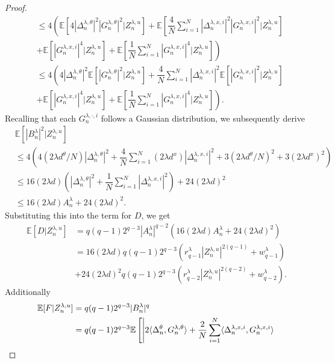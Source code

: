 \documentclass[a4paper, 10pt]{article}
\theoremstyle{plain}%
\begin{document}
\begin{proof}
\begin{align*}
&\leq 4\left(\mathbb{E}\left[4|\Delta_n^{\lambda,\theta}|^2|G_n^{\lambda,\theta}|^2|Z_n^{\lambda,u}\right]+\mathbb{E}\left[\dfrac{4}{N}\sum_{i=1}^N|\Delta_n^{\lambda,x,i}|^2|G_n^{\lambda,x,i}|^2|Z_n^{\lambda,u}\right]\right.\\
&+\left.\mathbb{E}\left[|G_n^{\lambda,x,i}|^4|Z_n^{\lambda,u}\right]+\mathbb{E}\left[\dfrac{1}{N}\sum_{i=1}^N|G_n^{\lambda,x,i}|^4|Z_n^{\lambda,u}\right]\right)\\
&\leq 4\left(4|\Delta_n^{\lambda,\theta}|^2\mathbb{E}\left[|G_n^{\lambda,\theta}|^2|Z_n^{\lambda,u}\right]+\dfrac{4}{N}\sum_{i=1}^N|\Delta_n^{\lambda,x,i}|^2\mathbb{E}\left[|G_n^{\lambda,x,i}|^2|Z_n^{\lambda,u}\right]\right.\\
&+\left.\mathbb{E}\left[|G_n^{\lambda,x,i}|^4|Z_n^{\lambda,u}\right]+\mathbb{E}\left[\dfrac{1}{N}\sum_{i=1}^N|G_n^{\lambda,x,i}|^4|Z_n^{\lambda,u}\right]\right).
\end{align*}
Recalling that each $G_n^{\lambda,\cdot,i}$ follows a Gaussian distribution, we subsequently derive
\begin{align*}
&\mathbb{E}\left[|B_n^{\lambda}|^2|Z_n^{\lambda,u}\right]\\&\leq 4\left(4(2\lambda d^{\theta}/N)|\Delta_n^{\lambda,\theta}|^2+\dfrac{4}{N}\sum_{i=1}^N(2\lambda d^x)|\Delta_n^{\lambda,x,i}|^2+3(2\lambda d^{\theta}/N)^2+3(2\lambda d^x)^2\right)\\
&\leq 16(2\lambda d)\left(|\Delta_n^{\lambda,\theta}|^2+\dfrac{1}{N}\sum_{i=1}^N|\Delta_n^{\lambda,x,i}|^2\right)+24(2\lambda d)^2\\
&\leq  16(2\lambda d)A_n^{\lambda}+24(2\lambda d)^2.
\end{align*}
Substituting this into the term for $D$, we get
\begin{align}
\mathbb{E}[D|Z_n^{\lambda,u}]&=q(q-1)2^{q-3}|A_n^{\lambda}|^{q-2}\left(16(2\lambda d)A_n^{\lambda}+24(2\lambda d)^2\right)\nonumber\\
&=16(2\lambda d)q(q-1)2^{q-3} \left(r_{q-1}^{\lambda}|Z_n^{\lambda,u}|^{2(q-1)}+w_{q-1}^{\lambda}\right)\nonumber\\&+24(2\lambda d)^2q(q-1)2^{q-3} \left(r_{q-2}^{\lambda}|Z_n^{\lambda,u}|^{2(q-2)}+w_{q-2}^{\lambda}\right).\label{eq:A4}
\end{align}
Additionally
\begin{align}
\mathbb{E}[F|Z_n^{\lambda,u}]&=q(q-1)2^{q-3}|B_n^{\lambda}|^q\notag\\
&=q(q-1)2^{q-3}\mathbb{E}\left[\left|2\langle \Delta_n^{\theta},G_n^{\lambda,\theta}\rangle+\dfrac{2}{N}\sum_{i=1}^N\langle \Delta_n^{\lambda,x,i},G_n^{\lambda,x,i}\rangle\right.\right.\notag\\

\end{align}
\end{proof}
\end{document}
